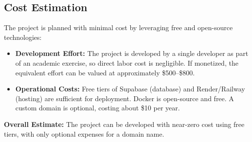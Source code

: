 \subsection*{Cost Estimation}
The project is planned with minimal cost by leveraging free and open-source technologies:
\begin{itemize}
    \item \textbf{Development Effort:} The project is developed by a single developer as part of an academic exercise, so direct labor cost is negligible. If monetized, the equivalent effort can be valued at approximately \$500--\$800.
    \item \textbf{Operational Costs:} Free tiers of Supabase (database) and Render/Railway (hosting) are sufficient for deployment. Docker is open-source and free. A custom domain is optional, costing about \$10 per year.
\end{itemize}

\noindent
\textbf{Overall Estimate:} The project can be developed with near-zero cost using free tiers, with only optional expenses for a domain name.

